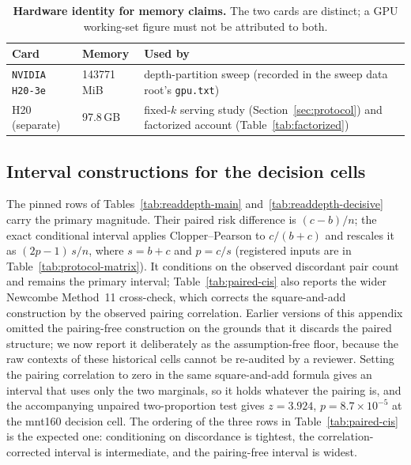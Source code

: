 \begin{table}[htbp]
\centering
\small
\setlength{\tabcolsep}{4pt}
\begin{tabular}{@{}p{}p{}p{}@{}}
\toprule
\textbf{Card} & \textbf{Memory} & \textbf{Used by} \\
\midrule
\texttt{NVIDIA H20-3e} & 143771\,MiB & depth-partition sweep (recorded in the sweep data root's \texttt{gpu.txt}) \\
H20 (separate) & 97.8\,GB & fixed-$k$ serving study (Section~\ref{sec:protocol}) and factorized account (Table~\ref{tab:factorized}) \\
\bottomrule
\end{tabular}
\caption{\textbf{Hardware identity for memory claims.}  The two cards are
distinct; a GPU working-set figure must not be attributed to both.}
\label{tab:hardware-identity}
\end{table}

\subsection{Interval constructions for the decision cells}
\label{app:paired-cis}
The pinned rows of Tables~\ref{tab:readdepth-main}
and~\ref{tab:readdepth-decisive} carry the primary
magnitude.  Their paired risk difference is $(c-b)/n$; the exact conditional
interval applies Clopper--Pearson to $c/(b+c)$ and rescales it as
$(2p-1)\,s/n$, where $s=b+c$ and $p=c/s$ (registered inputs are in
Table~\ref{tab:protocol-matrix}).  It conditions on the observed discordant
pair count and remains the primary interval; Table~\ref{tab:paired-cis} also
reports the wider Newcombe Method~11 cross-check, which corrects the
square-and-add construction by the observed pairing correlation.  Earlier
versions of this appendix omitted the pairing-free construction on the grounds
that it discards the paired structure; we now report it deliberately as the
assumption-free floor, because the raw contexts of these historical cells cannot
be re-audited by a reviewer.  Setting the pairing correlation to zero in the
same square-and-add formula gives an interval that uses only the two marginals,
so it holds whatever the pairing is, and the accompanying unpaired
two-proportion test gives $z=3.924$, $p=8.7\times10^{-5}$ at the mnt160
decision cell.  The ordering of the three rows in
Table~\ref{tab:paired-cis} is the expected one: conditioning on discordance is
tightest, the correlation-corrected interval is intermediate, and the
pairing-free interval is widest.

